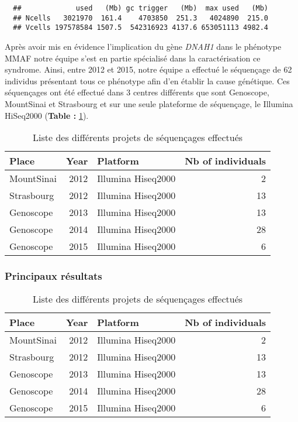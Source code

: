 \documentclass[12pt,twoside]{reedthesis}
\theoremstyle{definition}
\theoremstyle{definition}
\theoremstyle{remark}
\begin{document}
  \begin{verbatim}
  ##             used   (Mb) gc trigger   (Mb)  max used   (Mb)
  ## Ncells   3021970  161.4    4703850  251.3   4024890  215.0
  ## Vcells 197578584 1507.5  542316923 4137.6 653051113 4982.4
  \end{verbatim}
  
  Après avoir mis en évidence l'implication du gène \emph{DNAH1} dans le
  phénotype MMAF notre équipe s'est en partie spécialisé dans la
  caractérisation ce syndrome. Ainsi, entre 2012 et 2015, notre équipe a
  effectué le séquençage de 62 individus présentant tous ce phénotype afin
  d'en établir la cause génétique. Ces séquençages ont été effectué dans 3
  centres différents que sont Genoscope, MountSinai et Strasbourg et sur
  une seule plateforme de séquençage, le Illumina HiSeq2000 (\textbf{Table
  : }\ref{tab:tabrunbigmmaf}).
  
  \begin{longtable}[t]{lrlr}
  \caption{\label{tab:tabrunbigmmaf}Liste des différents projets de séquençages effectués}\\
  \toprule
  Place & Year & Platform & Nb of individuals\\
  \midrule
  MountSinai & 2012 & Illumina Hiseq2000 & 2\\
  Strasbourg & 2012 & Illumina Hiseq2000 & 13\\
  Genoscope & 2013 & Illumina Hiseq2000 & 13\\
  Genoscope & 2014 & Illumina Hiseq2000 & 28\\
  Genoscope & 2015 & Illumina Hiseq2000 & 6\\
  \bottomrule
  \end{longtable}
  
  
  
  \newpage
  
  \subsubsection{Principaux résultats}\label{principaux-resultats-4}
  
  \begin{longtable}[t]{lrlr}
  \caption{\label{tab:tabcfap43}Liste des différents projets de séquençages effectués}\\
  \toprule
  Place & Year & Platform & Nb of individuals\\
  \midrule
  MountSinai & 2012 & Illumina Hiseq2000 & 2\\
  Strasbourg & 2012 & Illumina Hiseq2000 & 13\\
  Genoscope & 2013 & Illumina Hiseq2000 & 13\\
  Genoscope & 2014 & Illumina Hiseq2000 & 28\\
  Genoscope & 2015 & Illumina Hiseq2000 & 6\\
  \bottomrule
  \end{longtable}
  
\end{document}
